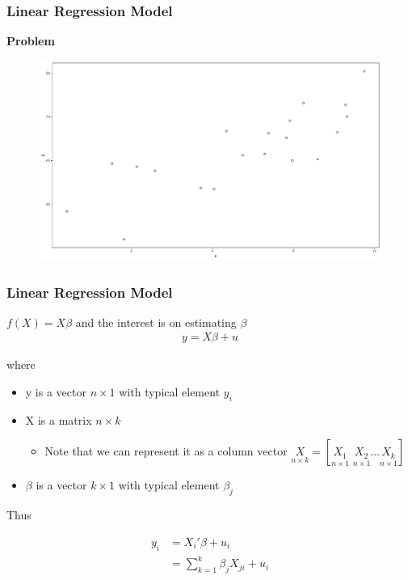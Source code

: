 \documentclass[
  shownotes,
  xcolor={svgnames},
  hyperref={colorlinks,citecolor=DarkBlue,linkcolor=DarkRed,urlcolor=DarkBlue}
  ]{beamer}
\begin{document}
\begin{frame}
\frametitle{Linear Regression Model}

{\bf Problem}


\begin{figure}[H] \centering
  \centering
  \includegraphics[scale=0.25]{figures/fig_1.pdf}
  \\
  \tiny
\end{figure}


\end{frame}
\begin{frame}
\frametitle{Linear Regression Model}
\bigskip
$f(X)=X\beta$ and the interest is on estimating $\beta$
\begin{align}
y = X \beta +u
\end{align}

where 
\begin{itemize}
  \item y is a vector $n \times 1$ with typical element $y_i$
  \item X is a matrix $n \times k$ 
  \begin{itemize}
    \tiny
      \item Note that we can represent it as a column vector $\underset{n\times k}{X}=[\underset{n\times 1}{X_1}\,\,\underset{n\times 1}{X_2}\dots \underset{n\times 1}{X_k}] $
  \end{itemize}
  \item $\beta$ is a vector $k \times 1$ with typical element $\beta_j$
\end{itemize}

\bigskip
Thus 

\begin{align}
y_i &= X_i' \beta +u_i  \\ \nonumber
    &= \sum_{k=1}^k \beta_j X_{ji} +u_i
\end{align}

\end{frame}
\end{document}
